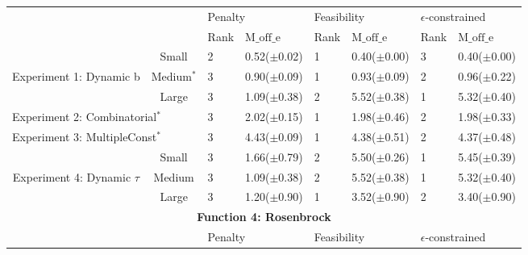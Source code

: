 \documentclass[review]{elsarticle}
\begin{document}
\begin{table*}[t]
{\begin{tabular}{cc|llllll}
                                  &        & \multicolumn{2}{l}{Penalty}   & \multicolumn{2}{l}{Feasibility} & \multicolumn{2}{l}{$\epsilon$-constrained}  \\
                                  &        & Rank & $\text{M\_off\_e}$ & Rank & $\text{M\_off\_e}$   & Rank & $\text{M\_off\_e}$                                \\
                                  & Small  & 2    & 0.52($\pm$0.02)            & 1    & 0.40($\pm$0.00)              & 3    & 0.40($\pm$0.00)                                           \\
Experiment 1: Dynamic b                         & Medium$^*$ & 3    & 0.90($\pm$0.09)            & 1    & 0.93($\pm$0.09)              & 2    & 0.96($\pm$0.22)                                           \\
                                  & Large  & 3    & 1.09($\pm$0.38)            & 2    & 5.52($\pm$0.38)              & 1    & 5.32($\pm$0.40)                                           \\
\multicolumn{2}{l|}{Experiment 2: Combinatorial$^*$}          & 3    & 2.02($\pm$0.15)            & 1    & 1.98($\pm$0.46)              & 2    & 1.98($\pm$0.33)                                           \\
\multicolumn{2}{l|}{Experiment 3: MultipleConst$^*$}          & 3    & 4.43($\pm$0.09)            & 1    & 4.38($\pm$0.51)              & 2    & 4.37($\pm$0.48)                                           \\
                                  & Small  & 3    & 1.66($\pm$0.79)            & 2    & 5.50($\pm$0.26)              & 1    & 5.45($\pm$0.39)                                           \\
Experiment 4: Dynamic $\tau$       & Medium & 3    & 1.09($\pm$0.38)            & 2    & 5.52($\pm$0.38)              & 1    & 5.32($\pm$0.40)                                           \\
                                  & Large  & 3    & 1.20($\pm$0.90)            & 1    & 3.52($\pm$0.90)              & 2    & 3.40($\pm$0.90)                                           \\\hline
\multicolumn{8}{c}{\textbf{Function 4: Rosenbrock}}                                                                                                                                 \\
                                  &        & \multicolumn{2}{l}{Penalty}   & \multicolumn{2}{l}{Feasibility} & \multicolumn{2}{l}{$\epsilon$-constrained}  \\

\end{tabular}}
\end{table*}
\end{document}
